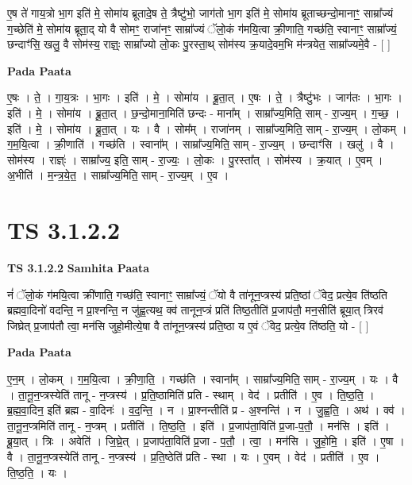 \documentclass[17pt]{extarticle}
\begin{document}
ए॒ष ते॑ गाय॒त्रो भा॒ग इति॑ मे॒ सोमा॑य ब्रूतादे॒ष ते॒ त्रैष्टु॑भो॒ जाग॑तो भा॒ग इति॑ मे॒ सोमा॑य ब्रूताच्छन्दो॒मानाꣳ॒॒ साम्रा᳚ज्यं ग॒च्छेति॑ मे॒ सोमा॑य ब्रूता॒द् यो वै सोमꣳ॒॒ राजा॑नꣳ॒॒ साम्रा᳚ज्यं ॅलो॒कं ग॑मयि॒त्वा क्री॒णाति॒ गच्छ॑ति॒ स्वानाꣳ॒॒ साम्रा᳚ज्यं॒ छन्दाꣳ॑सि॒ खलु॒ वै सोम॑स्य॒ राज्ञ्ः॒ साम्रा᳚ज्यो लो॒कः पु॒रस्ता॒थ् सोम॑स्य क्र॒यादे॒वम॒भि म॑न्त्रयेत॒ साम्रा᳚ज्यमे॒वै - [  ] \newline

\textbf{Pada Paata} \newline

ए॒षः । ते॒ । गा॒य॒त्रः । भा॒गः । इति॑ । मे॒ । सोमा॑य । ब्रू॒ता॒त् । ए॒षः । ते॒ । त्रैष्टु॑भः । जाग॑तः । भा॒गः । इति॑ । मे॒ । सोमा॑य । ब्रू॒ता॒त् । छ॒न्दो॒माना॒मिति॑ छन्दः - माना᳚म् । साम्रा᳚ज्य॒मिति॒ साम् - रा॒ज्य॒म् । ग॒च्छ॒ । इति॑ । मे॒ । सोमा॑य । ब्रू॒ता॒त् । यः । वै । सोम᳚म् । राजा॑नम् । साम्रा᳚ज्य॒मिति॒ साम् - रा॒ज्य॒म् । लो॒कम् । ग॒म॒यि॒त्वा । क्री॒णाति॑ । गच्छ॑ति । स्वाना᳚म् । साम्रा᳚ज्य॒मिति॒ साम् - रा॒ज्य॒म् । छन्दाꣳ॑सि । खलु॑ । वै । सोम॑स्य । राज्ञ्ः॑ । साम्रा᳚ज्य॒ इति॒ साम् - रा॒ज्यः॒ । लो॒कः । पु॒रस्ता᳚त् । सोम॑स्य । क्र॒यात् । ए॒वम् । अ॒भीति॑ । म॒न्त्र॒ये॒त॒ । साम्रा᳚ज्य॒मिति॒ साम् - रा॒ज्य॒म् । ए॒व ।  \newline





\section{ TS 3.1.2.2 }

\textbf{TS 3.1.2.2 } \newline
\textbf{Samhita Paata} \newline

नं॑ ॅलो॒कं ग॑मयि॒त्वा क्री॑णाति॒ गच्छ॑ति॒ स्वानाꣳ॒॒ साम्रा᳚ज्यं॒ ॅयो वै ता॑नून॒प्त्रस्य॑ प्रति॒ष्ठां ॅवेद॒ प्रत्ये॒व ति॑ष्ठति ब्रह्मवा॒दिनो॑ वदन्ति॒ न प्रा॒श्नन्ति॒ न जु॑ह्व॒त्यथ॒ क्व॑ तानून॒प्त्रं प्रति॑ तिष्ठ॒तीति॑ प्र॒जाप॑तौ॒ मन॒सीति॑ ब्रूया॒त् त्रिरव॑ जिघ्रेत् प्र॒जाप॑तौ त्वा॒ मन॑सि जुहो॒मीत्ये॒षा वै ता॑नून॒प्त्रस्य॑ प्रति॒ष्ठा य ए॒वं ॅवेद॒ प्रत्ये॒व ति॑ष्ठति॒ यो - [  ] \newline

\textbf{Pada Paata} \newline

ए॒न॒म् । लो॒कम् । ग॒म॒यि॒त्वा । क्री॒णा॒ति॒ । गच्छ॑ति । स्वाना᳚म् । साम्रा᳚ज्य॒मिति॒ साम् - रा॒ज्य॒म् । यः । वै । ता॒नू॒न॒प्त्रस्येति॑ तानू - न॒प्त्रस्य॑ । प्र॒ति॒ष्ठामिति॑ प्रति - स्थाम् । वेद॑ । प्रतीति॑ । ए॒व । ति॒ष्ठ॒ति॒ । ब्र॒ह्म॒वा॒दिन॒ इति॑ ब्रह्म - वा॒दिनः॑ । व॒द॒न्ति॒ । न । प्रा॒श्नन्तीति॑ प्र - अ॒श्नन्ति॑ । न । जु॒ह्व॒ति॒ । अथ॑ । क्व॑ । ता॒नू॒न॒प्त्रमिति॑ तानू - न॒प्त्रम् । प्रतीति॑ । ति॒ष्ठ॒ति॒ । इति॑ । प्र॒जाप॑ता॒विति॑ प्र॒जा-प॒तौ॒ । मन॑सि । इति॑ । ब्रू॒या॒त् । त्रिः । अवेति॑ । जि॒घ्रे॒त् । प्र॒जाप॑ता॒विति॑ प्र॒जा - प॒तौ॒ । त्वा॒ । मन॑सि । जु॒हो॒मि॒ । इति॑ । ए॒षा । वै । ता॒नू॒न॒प्त्रस्येति॑ तानू - न॒प्त्रस्य॑ । प्र॒ति॒ष्ठेति॑ प्रति - स्था । यः । ए॒वम् । वेद॑ । प्रतीति॑ । ए॒व । ति॒ष्ठ॒ति॒ । यः ।  \newline
\end{document}
